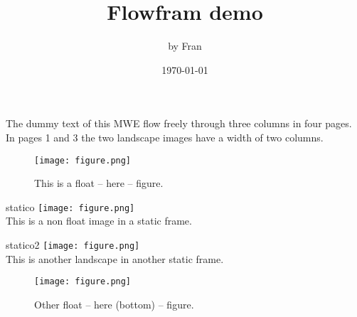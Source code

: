 \documentclass{article}
\title{\textbf{Flowfram demo}}
\author{by Fran}
\date{\today}
\begin{document}
\maketitle

{\color{blue} The dummy text of this MWE flow freely
through three columns in four pages. In pages 1 and 3 the
two landscape images have a width of two columns.}
\bigskip

\lipsum[1]

\begin{figure}[hb]
\texttt{[image: figure.png]}
\caption{This is a float -- here -- figure.}
\end{figure}

\begin{staticcontents*}{statico}
\texttt{[image: figure.png]}\\
{This is a non float image in a static frame.}
\end{staticcontents*}

\begin{staticcontents*}{statico2}
\texttt{[image: figure.png]}\\
{This is another landscape in another static frame.}
\end{staticcontents*}

\lipsum[2-3]

\begin{figure}[h]
\texttt{[image: figure.png]}
\caption{Other float -- here (bottom) -- figure.}
\end{figure}

\lipsum[4-35]
\end{document}
